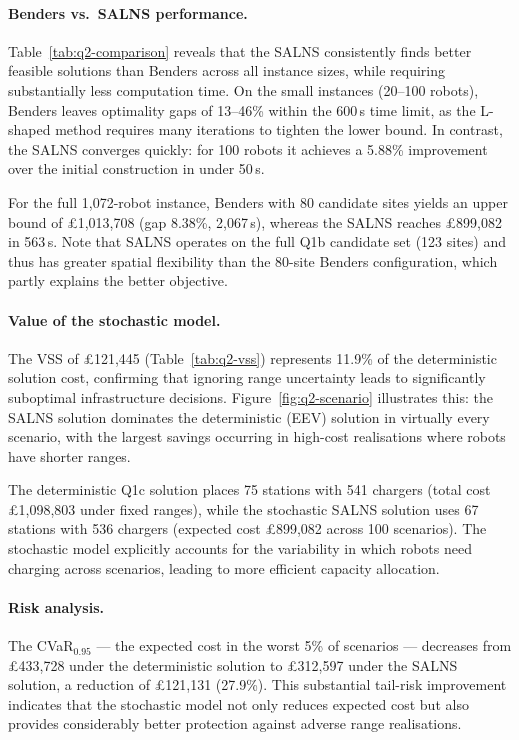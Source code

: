 \documentclass[11pt,a4paper]{article}
\begin{document}
\paragraph{Benders vs.\ SALNS performance.}
Table~\ref{tab:q2-comparison} reveals that the SALNS consistently finds better feasible solutions than Benders across all instance sizes, while requiring substantially less computation time.
On the small instances (20--100 robots), Benders leaves optimality gaps of 13--46\% within the 600\,s time limit, as the L-shaped method requires many iterations to tighten the lower bound.
In contrast, the SALNS converges quickly: for 100 robots it achieves a 5.88\% improvement over the initial construction in under 50\,s.

For the full 1,072-robot instance, Benders with 80 candidate sites yields an upper bound of \pounds1,013,708 (gap 8.38\%, 2,067\,s), whereas the SALNS reaches \pounds899,082 in 563\,s.
Note that SALNS operates on the full Q1b candidate set (123 sites) and thus has greater spatial flexibility than the 80-site Benders configuration, which partly explains the better objective.

\paragraph{Value of the stochastic model.}
The VSS of \pounds121,445 (Table~\ref{tab:q2-vss}) represents 11.9\% of the deterministic solution cost, confirming that ignoring range uncertainty leads to significantly suboptimal infrastructure decisions.
Figure~\ref{fig:q2-scenario} illustrates this: the SALNS solution dominates the deterministic (EEV) solution in virtually every scenario, with the largest savings occurring in high-cost realisations where robots have shorter ranges.

The deterministic Q1c solution places 75 stations with 541 chargers (total cost \pounds1,098,803 under fixed ranges), while the stochastic SALNS solution uses 67 stations with 536 chargers (expected cost \pounds899,082 across 100 scenarios).
The stochastic model explicitly accounts for the variability in which robots need charging across scenarios, leading to more efficient capacity allocation.

\paragraph{Risk analysis.}
The CVaR$_{0.95}$ --- the expected cost in the worst 5\% of scenarios --- decreases from \pounds433,728 under the deterministic solution to \pounds312,597 under the SALNS solution, a reduction of \pounds121,131 (27.9\%).
This substantial tail-risk improvement indicates that the stochastic model not only reduces expected cost but also provides considerably better protection against adverse range realisations.
\end{document}

